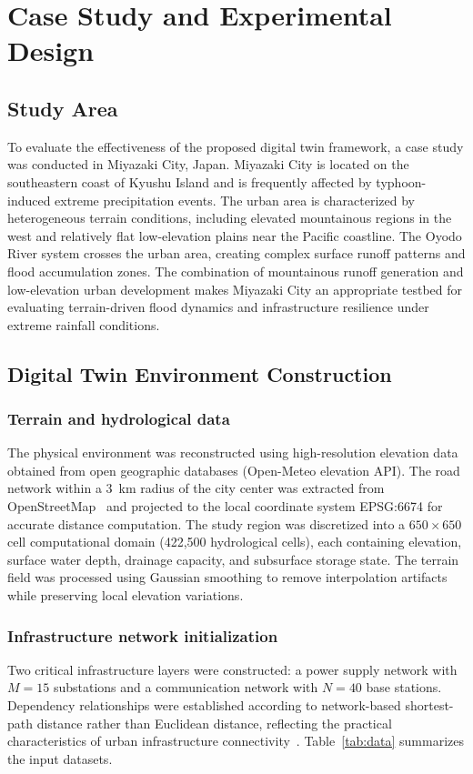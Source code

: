 \documentclass[preprint,12pt]{elsarticle}
\begin{document}
\section{Case Study and Experimental Design}\label{sec:case}

\subsection{Study Area}
To evaluate the effectiveness of the proposed digital twin framework, a case
study was conducted in Miyazaki City, Japan. Miyazaki City is located on the
southeastern coast of Kyushu Island and is frequently affected by
typhoon-induced extreme precipitation events. The urban area is characterized
by heterogeneous terrain conditions, including elevated mountainous regions
in the west and relatively flat low-elevation plains near the Pacific
coastline. The Oyodo River system crosses the urban area, creating complex
surface runoff patterns and flood accumulation zones. The combination of
mountainous runoff generation and low-elevation urban development makes
Miyazaki City an appropriate testbed for evaluating terrain-driven flood
dynamics and infrastructure resilience under extreme rainfall conditions.

\subsection{Digital Twin Environment Construction}
\subsubsection{Terrain and hydrological data}
The physical environment was reconstructed using high-resolution elevation
data obtained from open geographic databases (Open-Meteo elevation API). The
road network within a 3~km radius of the city center was extracted from
OpenStreetMap~\cite{haklay2008openstreetmap} and projected to the local
coordinate system EPSG:6674 for accurate distance computation. The study
region was discretized into a $650\times650$ cell computational domain
(422{,}500 hydrological cells), each containing elevation, surface water
depth, drainage capacity, and subsurface storage state. The terrain field was
processed using Gaussian smoothing to remove interpolation artifacts while
preserving local elevation variations.

\subsubsection{Infrastructure network initialization}
Two critical infrastructure layers were constructed: a power supply network
with $M=15$ substations and a communication network with $N=40$ base
stations. Dependency relationships were established according to
network-based shortest-path distance rather than Euclidean distance,
reflecting the practical characteristics of urban infrastructure
connectivity~\cite{rinaldi2001identifying}. Table~\ref{tab:data} summarizes
the input datasets.
\end{document}
